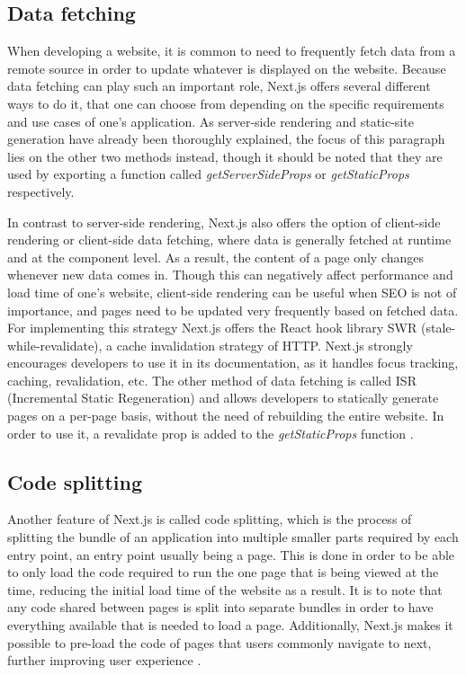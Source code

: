 \subsection{Data fetching}
When developing a website, it is common to need to frequently fetch data from a remote source in order to update whatever is displayed
on the website. Because data fetching can play such an important role, Next.js offers several different ways to do it, that one can choose
from depending on the specific requirements and use cases of one's application. As server-side rendering and static-site generation have already
been thoroughly explained, the focus of this paragraph lies on the other two methods instead, though it should be noted that they are used by
exporting a function called \emph{getServerSideProps} or \emph{getStaticProps} respectively.

In contrast to server-side rendering, Next.js also offers the
option of client-side rendering or client-side data fetching, where data is generally fetched at runtime and at the component level. As a
result, the content of a page only changes whenever new data comes in. Though this can negatively affect performance and load time of one's
website, client-side rendering can be useful when SEO is not of importance, and pages need to be updated very frequently based on fetched data.
For implementing this strategy Next.js offers the React hook library SWR (stale-while-revalidate), a cache invalidation strategy
of HTTP. Next.js strongly encourages developers to use it in its documentation, as it handles focus tracking, caching, revalidation, etc. The
other method of data fetching is called ISR (Incremental Static Regeneration) and allows developers to statically generate pages on a
per-page basis, without the need of rebuilding the entire website. In order to use it, a revalidate prop is added to the \emph{getStaticProps} function \cite{NextjsDataFetching}.
\\
\subsection{Code splitting}
Another feature of Next.js is called code splitting, which is the process of splitting the bundle of an application into multiple smaller parts
required by each entry point, an entry point usually being a page. This is done in order to be able to only load the code required to run the one
page that is being viewed at the time, reducing the initial load time of the website as a result. It is to note that any code shared between pages
is split into separate bundles in order to have everything available that is needed to load a page. Additionally, Next.js makes it possible to
pre-load the code of pages that users commonly navigate to next, further improving user experience \cite{NextjsCodeSplitting}.
\\
